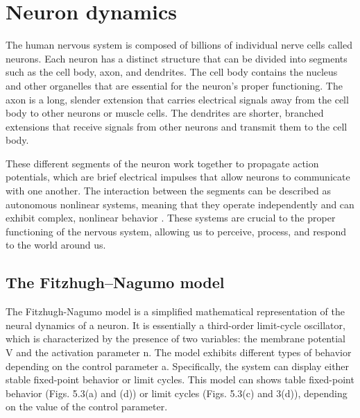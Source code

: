 \documentclass[12pt,a4paper]{report}
\begin{document}
\section{Neuron dynamics}
The human nervous system is composed of billions of individual nerve cells called neurons. Each neuron has a distinct structure that can be divided into segments such as the cell body, axon, and dendrites. The cell body contains the nucleus and other organelles that are essential for the neuron's proper functioning. The axon is a long, slender extension that carries electrical signals away from the cell body to other neurons or muscle cells. The dendrites are shorter, branched extensions that receive signals from other neurons and transmit them to the cell body. 

These different segments of the neuron work together to propagate action potentials, which are brief electrical impulses that allow neurons to communicate with one another. The interaction between the segments can be described as autonomous nonlinear systems, meaning that they operate independently and can exhibit complex, nonlinear behavior \cite{ref7}. These systems are crucial to the proper functioning of the nervous system, allowing us to perceive, process, and respond to the world around us.
\subsection{The Fitzhugh–Nagumo model}
The Fitzhugh-Nagumo model is a simplified mathematical representation of the neural dynamics of a neuron. It is essentially a third-order limit-cycle oscillator, which is characterized by the presence of two variables: the membrane potential V and the activation parameter n. The model exhibits different types of behavior depending on the control parameter a. Specifically, the system can display either stable fixed-point behavior or limit cycles. This model can shows table fixed-point behavior (Figs. 5.3(a) and (d)) or limit cycles (Figs. 5.3(c) and 3(d)), depending on the value of the control parameter. 
\end{document}

